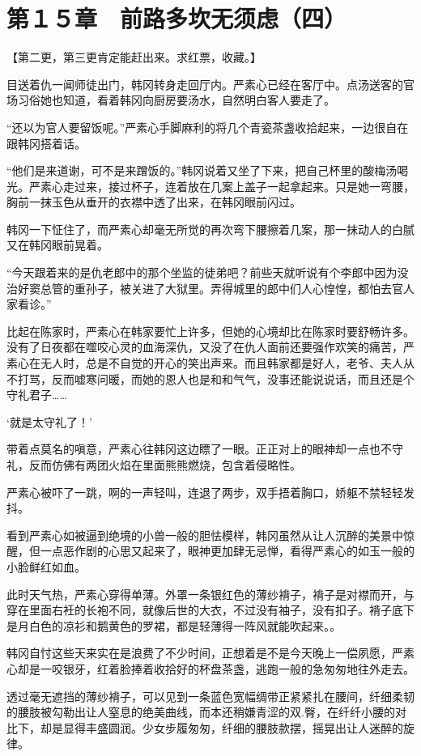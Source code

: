 \section{第１５章　前路多坎无须虑（四）}

【第二更，第三更肯定能赶出来。求红票，收藏。】

目送着仇一闻师徒出门，韩冈转身走回厅内。严素心已经在客厅中。点汤送客的官场习俗她也知道，看着韩冈向厨房要汤水，自然明白客人要走了。

“还以为官人要留饭呢。”严素心手脚麻利的将几个青瓷茶盏收拾起来，一边很自在跟韩冈搭着话。

“他们是来道谢，可不是来蹭饭的。”韩冈说着又坐了下来，把自己杯里的酸梅汤喝光。严素心走过来，接过杯子，连着放在几案上盖子一起拿起来。只是她一弯腰，胸前一抹玉色从垂开的衣襟中透了出来，在韩冈眼前闪过。

韩冈一下怔住了，而严素心却毫无所觉的再次弯下腰擦着几案，那一抹动人的白腻又在韩冈眼前晃着。

“今天跟着来的是仇老郎中的那个坐监的徒弟吧？前些天就听说有个李郎中因为没治好窦总管的重孙子，被关进了大狱里。弄得城里的郎中们人心惶惶，都怕去官人家看诊。”

比起在陈家时，严素心在韩家要忙上许多，但她的心境却比在陈家时要舒畅许多。没有了日夜都在噬咬心灵的血海深仇，又没了在仇人面前还要强作欢笑的痛苦，严素心在无人时，总是不自觉的开心的笑出声来。而且韩家都是好人，老爷、夫人从不打骂，反而嘘寒问暖，而她的恩人也是和和气气，没事还能说说话，而且还是个守礼君子……

‘就是太守礼了！’

带着点莫名的嗔意，严素心往韩冈这边瞟了一眼。正正对上的眼神却一点也不守礼，反而仿佛有两团火焰在里面熊熊燃烧，包含着侵略性。

严素心被吓了一跳，啊的一声轻叫，连退了两步，双手捂着胸口，娇躯不禁轻轻发抖。

看到严素心如被逼到绝境的小兽一般的胆怯模样，韩冈虽然从让人沉醉的美景中惊醒，但一点恶作剧的心思又起来了，眼神更加肆无忌惮，看得严素心的如玉一般的小脸鲜红如血。

此时天气热，严素心穿得单薄。外罩一条银红色的薄纱褙子，褙子是对襟而开，与穿在里面右衽的长袍不同，就像后世的大衣，不过没有袖子，没有扣子。褙子底下是月白色的凉衫和鹅黄色的罗裙，都是轻薄得一阵风就能吹起来。。

韩冈自忖这些天来实在是浪费了不少时间，正想着是不是今天晚上一偿夙愿，严素心却是一咬银牙，红着脸捧着收拾好的杯盘茶盏，逃跑一般的急匆匆地往外走去。

透过毫无遮挡的薄纱褙子，可以见到一条蓝色宽幅绸带正紧紧扎在腰间，纤细柔韧的腰肢被勾勒出让人窒息的绝美曲线，而本还稍嫌青涩的双.臀，在纤纤小腰的对比下，却是显得丰盛圆润。少女步履匆匆，纤细的腰肢款摆，摇晃出让人迷醉的旋律。

